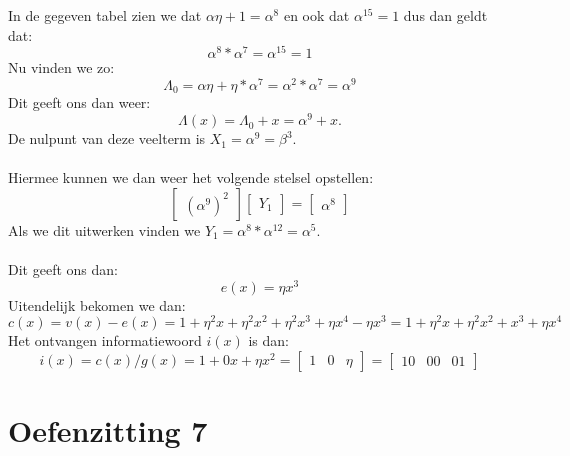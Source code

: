 \documentclass[11pt,a4paper,titlepage]{article}
\begin{document}
In de gegeven tabel zien we dat $\alpha\eta + 1 = \alpha ^8 $ en ook dat $\alpha ^{15} = 1$ dus dan geldt dat:
		$$\alpha ^8 * \alpha ^7 = \alpha ^{15} = 1$$
Nu vinden we zo:
	$$\Lambda_0 = \alpha\eta + \eta * \alpha ^7 = \alpha ^2 * \alpha ^7 = \alpha ^9 $$
\noindent Dit geeft ons dan weer:
	$$\Lambda (x) = \Lambda _0 + x =  \alpha ^9 + x.$$
De nulpunt van deze veelterm is $X_1 = \alpha ^9 = \beta ^3$.\\ \\
Hiermee kunnen we dan weer het volgende stelsel opstellen:
		$$\begin{bmatrix}(\alpha^9)^2\end{bmatrix} \begin{bmatrix}Y_1\end{bmatrix} = \begin{bmatrix}\alpha ^8\end{bmatrix} $$
Als we dit uitwerken vinden we $Y _1 = \alpha ^8 * \alpha ^{12} = \alpha ^5$.\\ \\
Dit geeft ons dan:
	$$e(x) = \eta x^3$$
Uitendelijk bekomen we dan:
	$$c(x) = v(x) - e(x) = 1 + \eta^2 x + \eta^2 x^2 + \eta^2 x^3 + \eta x^4 - \eta x^3 = 1 + \eta^2 x + \eta^2 x^2 + x^3 + \eta x^4$$
Het ontvangen informatiewoord $i(x)$ is dan:
	$$i(x) = c(x)/g(x) = 1 + 0x + \eta x^2 = \begin{bmatrix}1 & 0 & \eta\end{bmatrix} = \begin{bmatrix}10 & 00 & 01\end{bmatrix} $$
\newpage
\section{Oefenzitting 7}
\end{document}

